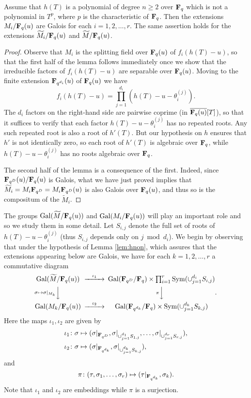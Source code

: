 \documentclass[a4paper]{compositio}
\begin{document}
\begin{lem}\label{lem:hnon} Assume that $h(T)$ is a polynomial of degree $n\geq 2$ over $\mathbf{F}_q$
which is not a polynomial in $T^p$, where $p$ is the characteristic
of $\mathbf{F}_q$. Then the extensions $M_i/\mathbf{F}_q(u)$ are Galois for each
$i=1, 2, \dots, r$. The same assertion holds for the extensions
$\widetilde{M}_i/\mathbf{F}_q(u)$ and $\widetilde{M}/\mathbf{F}_q(u)$.
\end{lem}
\begin{proof} Observe that $M_i$ is the splitting field over
$\mathbf{F}_q(u)$ of $f_i(h(T)-u)$, so that the first half of the lemma
follows immediately once we show that the irreducible factors of
$f_i(h(T)-u)$ are separable over $\mathbf{F}_q(u)$. Moving to the finite
extension $\mathbf{F}_{q^{d_i}}(u)$ of $\mathbf{F}_q(u)$ we have
\[ f_i(h(T)-u) = \prod_{j=1}^{d_i}(h(T) - u - \theta_i^{(j)}). \]
The $d_i$ factors on the right-hand side are pairwise coprime (in
$\overline{\mathbf{F}_q(u)}[T]$), so that it suffices to verify that each
factor $h(T) - u - \theta_i^{(j)}$ has no repeated roots. Any such
repeated root is also a root of $h'(T)$. But our hypothesis on $h$
ensures that $h'$ is not identically zero, so each root of $h'(T)$
is algebraic over $\mathbf{F}_q$, while $h(T) - u - \theta_i^{(j)}$ has no
roots algebraic over $\mathbf{F}_q$.

The second half of the lemma is a consequence of the first. Indeed,
since $\mathbf{F}_{q^D}(u)/\mathbf{F}_q(u)$ is Galois, what we have just proved
implies that $\widetilde{M}_i = M_i \mathbf{F}_{q^D} = M_i \mathbf{F}_{q^D}(u)$ is
also Galois over $\mathbf{F}_q(u)$, and thus so is the compositum of the
$\widetilde{M}_i$.
\end{proof}

The groups $\mathrm{Gal}(\widetilde{M}/\mathbf{F}_{q}(u))$ and $\mathrm{Gal}(M_i/\mathbf{F}_q(u))$
will play an important role and so we study them in some detail. Let
$S_{i,j}$ denote the full set of roots of $h(T) - u -
\theta_{i}^{(j)}$ (thus $S_{i,j}$ depends only on $j\bmod{d_i}$). We
begin by observing that under the hypothesis of Lemma
\ref{lem:hnon}, which assures that the extensions appearing below
are Galois, we have for each $k=1, 2, \dots, r$ a commutative
diagram
\begin{equation}\label{eq:cd}
\begin{CD}
\Gal(\widetilde{M}/\F_q(u)) @>\iota_1>> \Gal(\F_{q^D}/\F_q)\times
\prod_{i=1}^{r}\mathrm{Sym}(\cup_{j=1}^{d_i}S_{i,j})\\
@V \sigma \mapsto \sigma|_{M_k} VV @V\pi VV \\
\Gal(M_k/\F_q(u)) @>\iota_2 >> \Gal(\F_{q^{d_k}}/\F_q)\times
\mathrm{Sym}(\cup_{j=1}^{d_k}S_{k,j})
\end{CD}.
\end{equation} Here the maps $\iota_1, \iota_2$ are given by
\begin{align*}
 \iota_1\colon \sigma &\mapsto (\sigma|_{\mathbf{F}_{q^D}}, \sigma|_{\cup_{j=1}^{d_1} S_{1,j}}, \dots, \sigma|_{\cup_{j=1}^{d_r}
 S_{r,j}}),\\
\iota_2\colon \sigma &\mapsto (\sigma|_{\mathbf{F}_{q^{d_k}}},
\sigma|_{\cup_{j=1}^{d_k} S_{k,j}}),
\end{align*}
and
\[ \pi\colon (\tau, \sigma_1, \dots, \sigma_r) \mapsto (\tau|_{\mathbf{F}_{q^{d_k}}}, \sigma_k). \]
Note that $\iota_1$ and $\iota_2$ are embeddings while $\pi$ is a
surjection.
\end{document}
